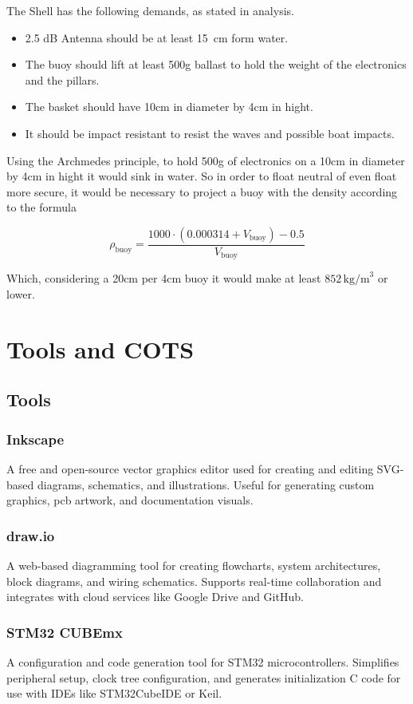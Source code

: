 The Shell has the following demands, as stated in analysis.

\begin{itemize}
    \item 2.5 dB Antenna should be at least 15 cm form water.
    \item The buoy should lift at least 500g ballast to hold the weight of the electronics and the pillars.
    \item The basket should have 10cm in diameter by 4cm in hight.
    \item It should be impact resistant to resist the waves and possible boat impacts.
\end{itemize} 

Using the Archmedes principle, to hold 500g of electronics on a 10cm in diameter by 4cm in hight it would
sink in water. So in order to float neutral of even float more secure, it would be necessary to project a 
buoy with the density according to the formula

\begin{equation}
    \rho_{\text{buoy}} = \frac{1000 \cdot (0.000314 + V_{\text{buoy}}) - 0.5}{V_{\text{buoy}}}
\end{equation}

Which, considering a 20cm per 4cm buoy it would make at least 
\(852 \, \text{kg/m}^3\) or lower.


\section{Tools and COTS}
\subsection{Tools}
\subsubsection{Inkscape}
A free and open-source vector graphics editor used for creating and editing SVG-based diagrams, schematics, and illustrations. Useful for generating custom graphics, \acrshort{pcb} artwork, and documentation visuals.
\subsubsection{draw.io}
A web-based diagramming tool for creating flowcharts, system architectures, block diagrams, and wiring schematics. Supports real-time collaboration and integrates with cloud services like Google Drive and GitHub.
\subsubsection{STM32 CUBEmx}
A configuration and code generation tool for STM32 microcontrollers. Simplifies peripheral setup, clock tree configuration, and generates initialization C code for use with IDEs like STM32CubeIDE or Keil.
